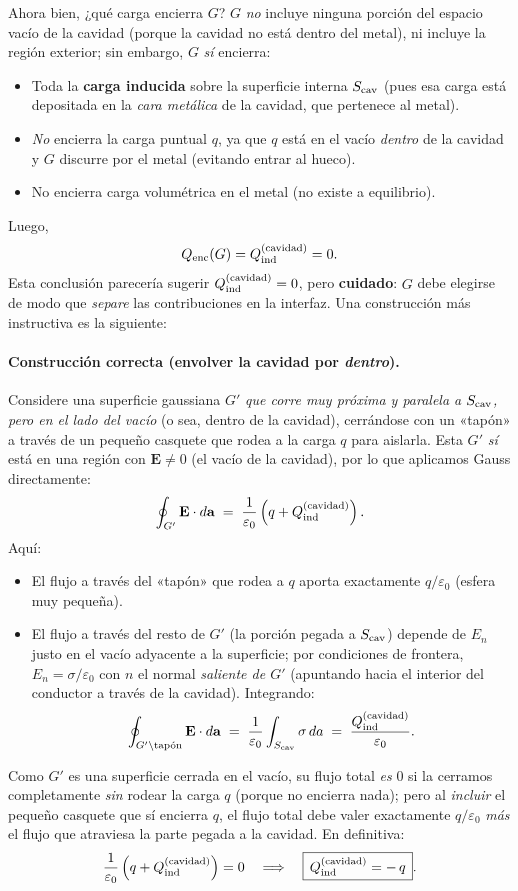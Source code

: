 \documentclass{article}
\begin{document}
Ahora bien, ¿qué carga encierra $G$? $G$ \emph{no} incluye ninguna porción del espacio vacío de la cavidad (porque la cavidad no está dentro del metal), ni incluye la región exterior; sin embargo, $G$ \emph{sí} encierra:
\begin{itemize}
  \item Toda la \textbf{carga inducida} sobre la superficie interna $S_{\rm cav}$ (pues esa carga está depositada en la \emph{cara metálica} de la cavidad, que pertenece al metal).
  \item \emph{No} encierra la carga puntual $q$, ya que $q$ está en el vacío \emph{dentro} de la cavidad y $G$ discurre por el metal (evitando entrar al hueco).
  \item No encierra carga volumétrica en el metal (no existe a equilibrio).
\end{itemize}
Luego,
\[
Q_{\rm enc}(G)=Q_{\rm ind}^{(\text{cavidad})}=0.
\]
Esta conclusión parecería sugerir $Q_{\rm ind}^{(\text{cavidad})}=0$, pero \textbf{cuidado}: $G$ debe elegirse de modo que \emph{separe} las contribuciones en la interfaz. Una construcción más instructiva es la siguiente:

\paragraph{Construcción correcta (envolver la cavidad por \emph{dentro}).}
Considere una superficie gaussiana $G'$ \emph{que corre muy próxima y paralela a $S_{\rm cav}$, pero en el lado del vacío} (o sea, dentro de la cavidad), cerrándose con un «tapón» a través de un pequeño casquete que rodea a la carga $q$ para aislarla. Esta $G'$ \emph{sí} está en una región con $\mathbf E\neq 0$ (el vacío de la cavidad), por lo que aplicamos Gauss directamente:
\[
\oint_{G'} \mathbf E\cdot d\mathbf a \;=\; \frac{1}{\varepsilon_0}\left(q + Q_{\rm ind}^{(\text{cavidad})}\right).
\]
Aquí:
\begin{itemize}
\item El flujo a través del «tapón» que rodea a $q$ aporta exactamente $q/\varepsilon_0$ (esfera muy pequeña).
\item El flujo a través del resto de $G'$ (la porción pegada a $S_{\rm cav}$) depende de $E_n$ justo en el vacío adyacente a la superficie; por condiciones de frontera, $E_n=\sigma/\varepsilon_0$ con $n$ el normal \emph{saliente de $G'$} (apuntando hacia el interior del conductor a través de la cavidad). Integrando:
\[
\oint_{G'\setminus \text{tapón}} \mathbf E\cdot d\mathbf a \;=\; \frac{1}{\varepsilon_0}\int_{S_{\rm cav}}\sigma\,da
\;=\;\frac{Q_{\rm ind}^{(\text{cavidad})}}{\varepsilon_0}.
\]
\end{itemize}
Como $G'$ es una superficie cerrada en el vacío, su flujo total \emph{es} $0$ si la cerramos completamente \emph{sin} rodear la carga $q$ (porque no encierra nada); pero al \emph{incluir} el pequeño casquete que sí encierra $q$, el flujo total debe valer exactamente $q/\varepsilon_0$ \emph{más} el flujo que atraviesa la parte pegada a la cavidad. En definitiva:
\[
\frac{1}{\varepsilon_0}\left(q + Q_{\rm ind}^{(\text{cavidad})}\right)=0
\quad\Longrightarrow\quad
\boxed{\,Q_{\rm ind}^{(\text{cavidad})}=-\,q\,}.
\]
\end{document}
